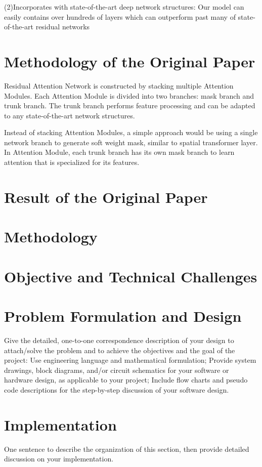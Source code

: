 \documentclass{article}
\begin{document}
\begin{multicols}{2}
(2)Incorporates with state-of-the-art deep network structures:
Our model can easily contains over hundreds of layers which can outperform past many of state-of-the-art residual networks


\section{Methodology of the Original Paper}
Residual Attention Network is constructed by stacking multiple Attention Modules. Each Attention Module is divided into two branches: mask branch and trunk branch. The trunk branch performs feature processing and can be adapted to any state-of-the-art network structures.

Instead of stacking Attention Modules, a
simple approach would be using a single network branch
to generate soft weight mask, similar to spatial transformer
layer. In Attention Module, each trunk branch has its own
mask branch to learn attention that is specialized for its features.


\section{Result of the Original Paper}

\section{Methodology}

\section{Objective and Technical Challenges}


\section{Problem Formulation and Design}
Give the detailed, one-to-one correspondence description of your design to attach/solve the problem and to achieve the objectives and the goal of the project:
Use engineering language and mathematical formulation;
Provide system drawings, block diagrams, and/or circuit schematics for your software or hardware design, as applicable to your project; 
Include flow charts and pseudo code descriptions for the step-by-step discussion of your software design.


\section{Implementation}
One sentence to describe the organization of this section, then provide detailed discussion on your implementation. 


\end{multicols}
\end{document}
